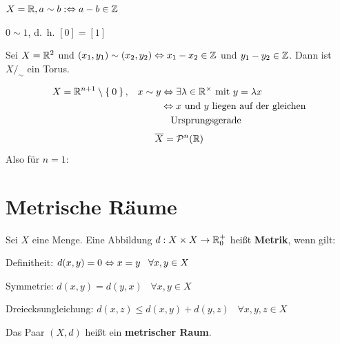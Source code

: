 \begin{beispiel}
    $X = \mathbb{R}, a \sim b :\Leftrightarrow a-b \in \mathbb{Z}$
    
    

    $0 \sim 1$, d.~h. $[0] = [1]$
\end{beispiel}

\begin{beispiel}%
    Sei $X = \mathbb{R}^2$ und $(x_1, y_1) \sim (x_2, y_2) \Leftrightarrow x_1 - x_2 \in \mathbb{Z}$ 
    und $y_1 - y_2 \in \mathbb{Z}$. Dann ist $X /_\sim$ ein Torus.
\end{beispiel}

\begin{beispiel}%
    \begin{align*}
        X= \mdr^{n+1} \setminus \Set{0},\;\;\; x \sim y &\gdw \exists \lambda \in \mdr^\times \text{ mit } y = \lambda x\\
            &\gdw x \text{ und } y \text{ liegen auf der gleichen}\\
            &\hphantom{\gdw} \text{Ursprungsgerade}
    \end{align*}
    \[\overline{X} = \mathcal{P}^n(\mathbb{R})\]
    Also für $n=1$:\nopagebreak\\
    
\end{beispiel}

\section{Metrische Räume}
\begin{definition}%
    Sei $X$ eine Menge. Eine Abbildung $d:X\times X \rightarrow \mathbb{R}_0^+$
    heißt \textbf{Metrik}, wenn gilt:

    \begin{defenumprops}
        \item Definitheit:         \tabto{4cm} $d(x,y) = 0 \Leftrightarrow x = y \;\;\; \forall x, y \in X$
        \item Symmetrie:           \tabto{4cm} $d(x,y) = d(y,x) \;\;\; \forall x, y \in X$
        \item Dreiecksungleichung: \tabto{4cm} $d(x,z) \leq d(x,y) + d(y,z) \;\;\; \forall x, y, z \in X$
    \end{defenumprops}

    Das Paar $(X, d)$ heißt ein \textbf{metrischer Raum}.
\end{definition}

